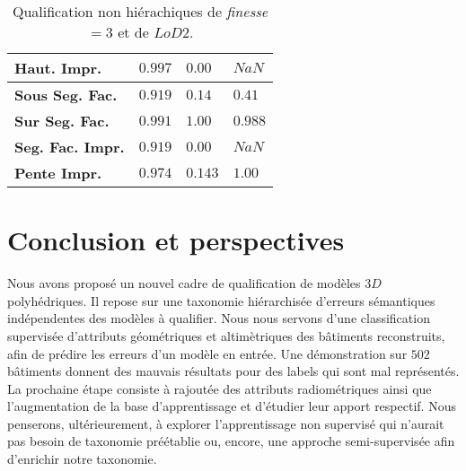 \documentclass[a4paper,french]{article}
\begin{document}
{\begin{table}[H]
\begin{minipage}{.46\linewidth}
\begin{minipage}{.95\linewidth}
\begin{flushright}
\begin{tabular}{x{2.5cm} x{1cm} x{1cm} x{1cm}}
                            \textbf{Haut. Impr.} & $0.997$ & $0.00$ & $NaN$ \\
                            \midrule
                            \textbf{Sous Seg. Fac.} & $0.919$ & $0.14$ & $0.41$ \\
                            \midrule
                            \textbf{Sur Seg. Fac.} & $0.991$ & $1.00$ & $0.988$ \\
                            \midrule
                            \textbf{Seg. Fac. Impr.} & $0.919$ & $0.00$ & $NaN$\\
                            \midrule
                            \textbf{Pente Impr.} & $0.974$ & $0.143$ & $1.00$\\
                            \bottomrule
                        \end{tabular}
                        \caption{\label{tab::multilab_d3}Qualification non hiérachiques de \emph{finesse} $ = 3$ et de $LoD 2$.}
                    \end{flushright}
                \end{minipage}
            \end{minipage}
        \end{table}
    }

    \section{Conclusion et perspectives}

    Nous avons proposé un nouvel cadre de qualification de modèles $3D$ polyhédriques. Il repose sur une taxonomie hiérarchisée d'erreurs sémantiques indépendentes des modèles à qualifier. Nous nous servons d'une classification supervisée d'attributs géométriques et altimètriques des bâtiments reconstruits, afin de prédire les erreurs d'un modèle en entrée. Une démonstration sur $502$ bâtiments donnent des mauvais résultats pour des labels qui sont mal représentés. La prochaine étape consiste à rajoutée des attributs radiométriques ainsi que l'augmentation de la base d'apprentissage et d'étudier leur apport respectif. Nous penserons, ultérieurement, à explorer l'apprentissage non supervisé qui n'aurait pas besoin de taxonomie préétablie ou, encore, une approche semi-supervisée afin d'enrichir notre taxonomie.

    
    
\end{document}
